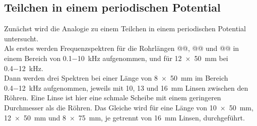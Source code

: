 \subsection{Teilchen in einem periodischen Potential}
Zunächst wird die Analogie zu einem Teilchen in einem periodischen Potential untersucht.  \\
\newline
\noindent
Als erstes werden Frequenzspektren für die Rohrlängen @@, @@ und @@ in einem Bereich von \SI{0.1-10}{\kilo\hertz} aufgenommen, und für \SI{12 x 50}{\milli\meter} bei \SI{0.4-12}{\kilo\hertz}. \\
\newline
\noindent
Dann werden drei Spektren bei einer Länge von \SI{8 x 50}{\milli\meter} im Bereich \SI{0.4-12}{\kilo\hertz} aufgenommen, jeweils mit 10, 13 und \SI{16}{\milli\meter} Linsen zwischen den Röhren.
Eine Linse ist hier eine schmale Scheibe mit einem geringeren Durchmesser als die Röhren.
Das Gleiche wird für eine Länge von \SI{10x 50}{\milli\meter}, \SI{12 x 50}{\milli\meter} und \SI{8 x 75}{\milli\meter}, je getrennt von \SI{16}{\milli\meter} Linsen, durchgeführt. \\

